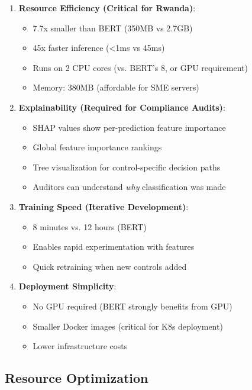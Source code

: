 \documentclass[11pt,conference]{IEEEtran}
\begin{document}
\begin{enumerate}
    \item \textbf{Resource Efficiency (Critical for Rwanda)}:
    \begin{itemize}
        \item 7.7x smaller than BERT (350MB vs 2.7GB)
        \item 45x faster inference (<1ms vs 45ms)
        \item Runs on 2 CPU cores (vs. BERT's 8, or GPU requirement)
        \item Memory: 380MB (affordable for SME servers)
    \end{itemize}

    \item \textbf{Explainability (Required for Compliance Audits)}:
    \begin{itemize}
        \item SHAP values show per-prediction feature importance
        \item Global feature importance rankings
        \item Tree visualization for control-specific decision paths
        \item Auditors can understand \textit{why} classification was made
    \end{itemize}

    \item \textbf{Training Speed (Iterative Development)}:
    \begin{itemize}
        \item 8 minutes vs. 12 hours (BERT)
        \item Enables rapid experimentation with features
        \item Quick retraining when new controls added
    \end{itemize}

    \item \textbf{Deployment Simplicity}:
    \begin{itemize}
        \item No GPU required (BERT strongly benefits from GPU)
        \item Smaller Docker images (critical for K8s deployment)
        \item Lower infrastructure costs
    \end{itemize}
\end{enumerate}

\subsection{Resource Optimization}
\end{document}
